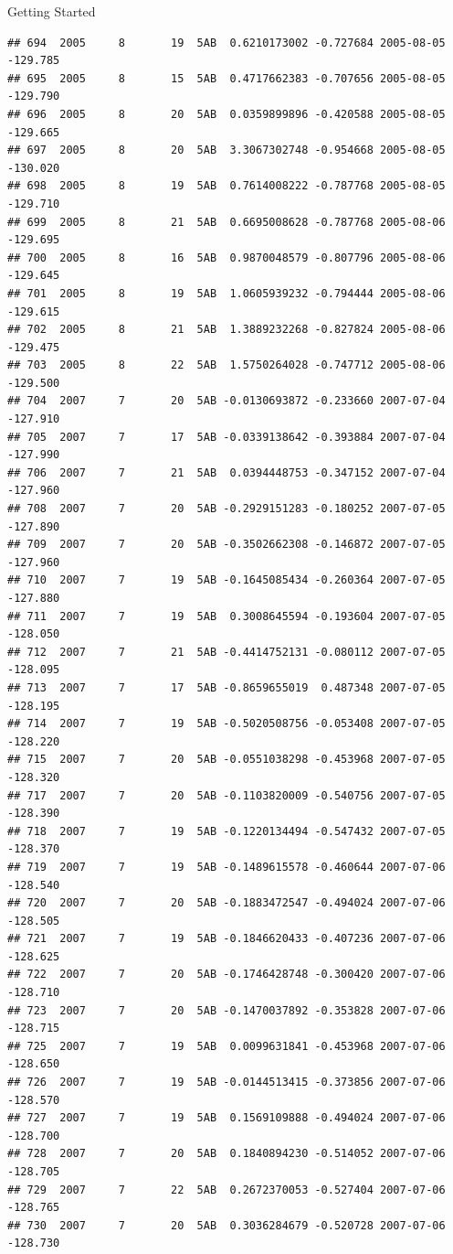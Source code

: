\documentclass[
  ignorenonframetext,
]{beamer}
\begin{document}
\begin{frame}[fragile]{Getting Started}
\begin{verbatim}
## 694  2005     8       19  5AB  0.6210173002 -0.727684 2005-08-05 -129.785
## 695  2005     8       15  5AB  0.4717662383 -0.707656 2005-08-05 -129.790
## 696  2005     8       20  5AB  0.0359899896 -0.420588 2005-08-05 -129.665
## 697  2005     8       20  5AB  3.3067302748 -0.954668 2005-08-05 -130.020
## 698  2005     8       19  5AB  0.7614008222 -0.787768 2005-08-05 -129.710
## 699  2005     8       21  5AB  0.6695008628 -0.787768 2005-08-06 -129.695
## 700  2005     8       16  5AB  0.9870048579 -0.807796 2005-08-06 -129.645
## 701  2005     8       19  5AB  1.0605939232 -0.794444 2005-08-06 -129.615
## 702  2005     8       21  5AB  1.3889232268 -0.827824 2005-08-06 -129.475
## 703  2005     8       22  5AB  1.5750264028 -0.747712 2005-08-06 -129.500
## 704  2007     7       20  5AB -0.0130693872 -0.233660 2007-07-04 -127.910
## 705  2007     7       17  5AB -0.0339138642 -0.393884 2007-07-04 -127.990
## 706  2007     7       21  5AB  0.0394448753 -0.347152 2007-07-04 -127.960
## 708  2007     7       20  5AB -0.2929151283 -0.180252 2007-07-05 -127.890
## 709  2007     7       20  5AB -0.3502662308 -0.146872 2007-07-05 -127.960
## 710  2007     7       19  5AB -0.1645085434 -0.260364 2007-07-05 -127.880
## 711  2007     7       19  5AB  0.3008645594 -0.193604 2007-07-05 -128.050
## 712  2007     7       21  5AB -0.4414752131 -0.080112 2007-07-05 -128.095
## 713  2007     7       17  5AB -0.8659655019  0.487348 2007-07-05 -128.195
## 714  2007     7       19  5AB -0.5020508756 -0.053408 2007-07-05 -128.220
## 715  2007     7       20  5AB -0.0551038298 -0.453968 2007-07-05 -128.320
## 717  2007     7       20  5AB -0.1103820009 -0.540756 2007-07-05 -128.390
## 718  2007     7       19  5AB -0.1220134494 -0.547432 2007-07-05 -128.370
## 719  2007     7       19  5AB -0.1489615578 -0.460644 2007-07-06 -128.540
## 720  2007     7       20  5AB -0.1883472547 -0.494024 2007-07-06 -128.505
## 721  2007     7       19  5AB -0.1846620433 -0.407236 2007-07-06 -128.625
## 722  2007     7       20  5AB -0.1746428748 -0.300420 2007-07-06 -128.710
## 723  2007     7       20  5AB -0.1470037892 -0.353828 2007-07-06 -128.715
## 725  2007     7       19  5AB  0.0099631841 -0.453968 2007-07-06 -128.650
## 726  2007     7       19  5AB -0.0144513415 -0.373856 2007-07-06 -128.570
## 727  2007     7       19  5AB  0.1569109888 -0.494024 2007-07-06 -128.700
## 728  2007     7       20  5AB  0.1840894230 -0.514052 2007-07-06 -128.705
## 729  2007     7       22  5AB  0.2672370053 -0.527404 2007-07-06 -128.765
## 730  2007     7       20  5AB  0.3036284679 -0.520728 2007-07-06 -128.730

\end{verbatim}
\end{frame}
\end{document}
